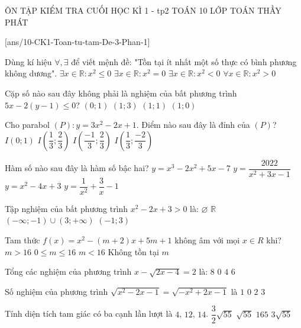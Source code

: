 \setcounter{deso}{2}
\begin{name}
	{ÔN TẬP KIỂM TRA CUỐI HỌC KÌ 1 - tp2}
	{TOÁN 10}
	{LỚP TOÁN THẦY PHÁT}
	{\thoigian}
\end{name}
[ans/10-CK1-Toan-tu-tam-De-3-Phan-1]
\TN
\begin{ex}
 Dùng kí hiệu $\forall ,\exists $ để viết mệnh đề: "Tồn tại ít nhất một số thực có bình phương không dương".
\choice
{$\exists x\in \mathbb{R}\colon x^2\le 0$}
{$\exists x\in \mathbb{R}\colon x^2=0$}
{$\exists x\in \mathbb{R}\colon x^2<0$}
{$\forall x\in \mathbb{R}\colon x^2>0$}
\loigiai{ }
\end{ex}
\begin{ex}
 Cặp số nào sau đây không phải là nghiệm của bất phương trình $5x-2(y-1)\le 0$?
\choice
{$(0;1)$}
{$(1;3)$}
{$(1;1)$}
{$(1;0)$}
\loigiai{ }
\end{ex}\newpage
\begin{ex}
 Cho parabol $(P)\colon y=3x^2-2x+1$. Điểm nào sau đây là đỉnh của $(P)$?
\choice
{$I(0;1)$}
{$I\left(\dfrac{1}{3};\dfrac{2}{3}\right)$}
{$I\left(\dfrac{-1}{3};\dfrac{2}{3}\right)$}
{$I\left(\dfrac{1}{3};\dfrac{-2}{3}\right)$}
\loigiai{ }
\end{ex}
\begin{ex}
 Hàm số nào sau đây là hàm số bậc hai?
\choice
{${y=x^3-2 x^2+5 x-7}$}
{${y=\dfrac{2022}{x^2+3 x-1}}$}
{${y=x^2-4 x+3}$}
{${y=\dfrac{1}{x^2}+\dfrac{3}{x}-1}$}
\loigiai{ }
\end{ex}\newpage
\begin{ex}
 Tập nghiệm của bất phương trình $x^2-2 x+3>0$ là:
\choice
{${\varnothing}$}
{${\mathbb{R}}$}
{${(-\infty ;-1) \cup(3 ;+\infty)}$}
{${(-1 ; 3)}$}
\loigiai{ }
\end{ex}
\begin{ex}
 Tam thức ${f(x)=x^2-(m+2) x+5 m+1}$ không âm với mọi $x\in R$ khi?
\choice
{${m>16}$}
{${0 \leq m \leq 16}$}
{${m<16}$}
{Không tồn tại $m$}
\loigiai{ }
\end{ex}\newpage
\begin{ex}
 Tổng các nghiệm của phương trình $x-\sqrt{2x-4}=2$ là:
\choice
{$8$}
{$0$}
{$4$}
{$6$}
\loigiai{ }
\end{ex}
\begin{ex}
 Số nghiệm của phương trình $\sqrt{x^2-2x-1}=\sqrt{-x^2+2x-1}$ là
\choice
{$1$}
{$0$}
{$2$}
{$3$}
\loigiai{ }
\end{ex}\newpage
\begin{ex}
 Tính diện tích tam giác có ba cạnh lần lượt là $4$, $12$, $14$.
\choice
{$\dfrac{3}{2}\sqrt{55}$}
{$\sqrt{55}$}
{$165$}
{$3\sqrt{55}$}
\loigiai{ }
\end{ex}
